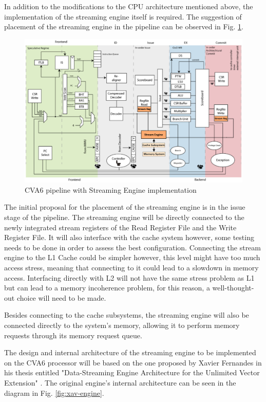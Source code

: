 In addition to the modifications to the CPU architecture mentioned above, the implementation of the streaming engine itself is required. The suggestion of placement of the streaming engine in the pipeline can be observed in Fig. \ref{fig:cva6-altered-pipeline}.
\begin{figure}[H]
    \centering
    \includegraphics[width=0.75\linewidth]{images/cva6-overview-altered-simplified.png}
    \caption{CVA6 pipeline with Streaming Engine implementation}
    \label{fig:cva6-altered-pipeline}
\end{figure}


The initial proposal for the placement of the streaming engine is in the issue stage of the pipeline. The streaming engine will be directly connected to the newly integrated stream registers of the Read Register File and the Write Register File. It will also interface with the cache system however, some testing needs to be done in order to assess the best configuration. Connecting the stream engine to the L1 Cache could be simpler however, this level might have too much access stress, meaning that connecting to it could lead to a slowdown in memory access. Interfacing directly with L2 will not have the same stress problem as L1 but can lead to a memory incoherence problem,  for this reason, a well-thought-out choice will need to be made.

Besides connecting to the cache subsystems, the streaming engine will also be connected directly to the system's memory, allowing it to perform memory requests through its memory request queue.


The design and internal architecture of the streaming engine to be implemented on the CVA6 processor will be based on the one proposed by Xavier Fernandes in his thesis entitled "Data-Streaming Engine Architecture for the Unlimited Vector Extension" \cite{thesis-xf}. The original engine's internal architecture can be seen in the diagram in Fig. \ref{fig:xav-engine}.

